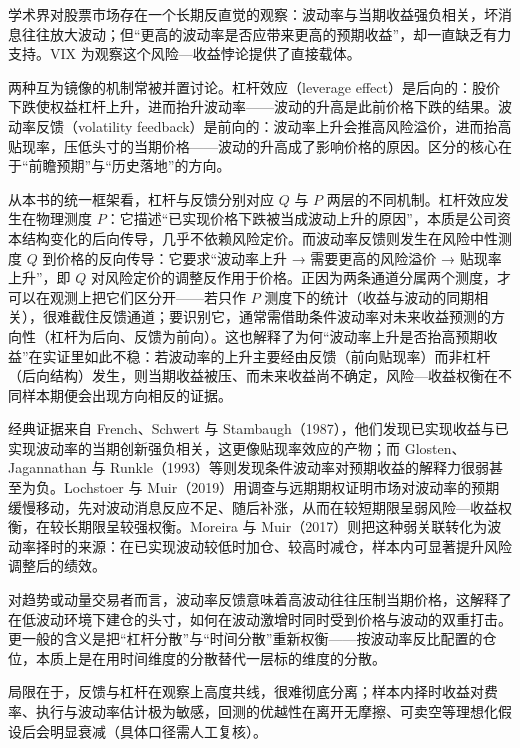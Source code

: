\documentclass[11pt,a4paper]{ctexart}
\begin{document}
学术界对股票市场存在一个长期反直觉的观察：波动率与当期收益强负相关，坏消息往往放大波动；但“更高的波动率是否应带来更高的预期收益”，却一直缺乏有力支持。VIX 为观察这个风险—收益悖论提供了直接载体。

两种互为镜像的机制常被并置讨论。杠杆效应（leverage effect）是后向的：股价下跌使权益杠杆上升，进而抬升波动率——波动的升高是此前价格下跌的结果。波动率反馈（volatility feedback）是前向的：波动率上升会推高风险溢价，进而抬高贴现率，压低头寸的当期价格——波动的升高成了影响价格的原因。区分的核心在于“前瞻预期”与“历史落地”的方向。

从本书的统一框架看，杠杆与反馈分别对应 $Q$ 与 $P$ 两层的不同机制。杠杆效应发生在物理测度 $P$：它描述“已实现价格下跌被当成波动上升的原因”，本质是公司资本结构变化的后向传导，几乎不依赖风险定价。而波动率反馈则发生在风险中性测度 $Q$ 到价格的反向传导：它要求“波动率上升 → 需要更高的风险溢价 → 贴现率上升”，即 $Q$ 对风险定价的调整反作用于价格。正因为两条通道分属两个测度，才可以在观测上把它们区分开——若只作 $P$ 测度下的统计（收益与波动的同期相关），很难截住反馈通道；要识别它，通常需借助条件波动率对未来收益预测的方向性（杠杆为后向、反馈为前向）。这也解释了为何“波动率上升是否抬高预期收益”在实证里如此不稳：若波动率的上升主要经由反馈（前向贴现率）而非杠杆（后向结构）发生，则当期收益被压、而未来收益尚不确定，风险—收益权衡在不同样本期便会出现方向相反的证据。

经典证据来自 French、Schwert 与 Stambaugh（1987），他们发现已实现收益与已实现波动率的当期创新强负相关，这更像贴现率效应的产物；而 Glosten、Jagannathan 与 Runkle（1993）等则发现条件波动率对预期收益的解释力很弱甚至为负。Lochstoer 与 Muir（2019）用调查与远期期权证明市场对波动率的预期缓慢移动，先对波动消息反应不足、随后补涨，从而在较短期限呈弱风险—收益权衡，在较长期限呈较强权衡。Moreira 与 Muir（2017）则把这种弱关联转化为波动率择时的来源：在已实现波动较低时加仓、较高时减仓，样本内可显著提升风险调整后的绩效。

对趋势或动量交易者而言，波动率反馈意味着高波动往往压制当期价格，这解释了在低波动环境下建仓的头寸，如何在波动激增时同时受到价格与波动的双重打击。更一般的含义是把“杠杆分散”与“时间分散”重新权衡——按波动率反比配置的仓位，本质上是在用时间维度的分散替代一层标的维度的分散。

局限在于，反馈与杠杆在观察上高度共线，很难彻底分离；样本内择时收益对费率、执行与波动率估计极为敏感，回测的优越性在离开无摩擦、可卖空等理想化假设后会明显衰减（具体口径需人工复核）。

\end{document}
